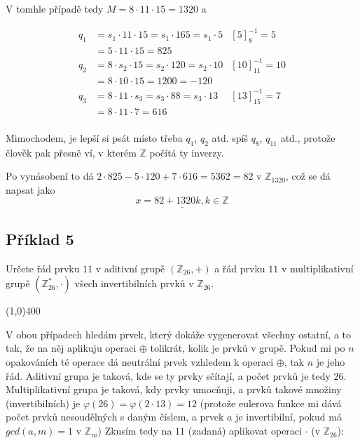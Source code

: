 \documentclass{article}
\begin{document}
V tomhle případě tedy $M = 8\cdot 11\cdot 15 = 1320$ a 

\begin{align*}
q_1 & = s_1\cdot 11 \cdot 15 = s_1 \cdot 165 = s_1 \cdot 5		& \left[ 5\right]^{-1}_8 = 5\\
		& = 5 \cdot 11 \cdot 15 = 825 & \\
q_2 & = 8 \cdot s_2 \cdot 15 = s_2 \cdot 120 = s_2 \cdot 10		& \left[ 10\right]^{-1}_{11} = 10\\
		& = 8 \cdot 10 \cdot 15 = 1200 = -120 & \\
q_3 & = 8 \cdot 11 \cdot s_3 = s_3 \cdot 88 = s_3 \cdot 13		& \left[ 13\right]^{-1}_{15} = 7 \\
		& = 8 \cdot 11 \cdot 7 = 616 & \\
\end{align*}

Mimochodem, je lepší si psát místo třeba $q_1$, $q_2$ atd. spíš $q_8$, $q_{11}$ atd., protože člověk pak přesně ví, v kterém $\mathbb{Z}$ počítá ty inverzy.

Po vynásobení to dá $2\cdot 825 - 5\cdot 120 + 7\cdot 616 = 5362 = 82$ v $\mathbb{Z}_{1320}$, což se dá napsat jako $$\underline{x = 82 + 1320k, k \in \mathbb{Z}}$$

\subsection{\label{priklad1-5}Příklad 5}
Určete řád prvku $11$ v aditivní grupě $(\mathbb{Z}_{26},+)$ a řád prvku $11$ v multiplikativní grupě $(\mathbb{Z}_{26}^{*},\cdot)$ všech invertibilních prvků v $\mathbb{Z}_{26}$.

\line(1,0){400}

V obou případech hledám prvek, který dokáže vygenerovat všechny ostatní, a to tak, že na něj aplikuju operaci $\oplus$ tolikrát, kolik je prvků v grupě. Pokud mi po $n$ opakováních té operace dá neutrální prvek vzhledem k operaci $\oplus$, tak $n$ je jeho řád. Aditivní grupa je taková, kde se ty prvky sčítají, a počet prvků je tedy $26$. Multiplikativní grupa je taková, kdy prvky umocňuji, a prvků takové množiny (invertibilních) je $\varphi(26) = \varphi(2 \cdot 13) = 12$ (protože eulerova funkce mi dává počet prvků nesoudělných s daným číslem, a prvek $a$ je invertibilní, pokud má $gcd(a, m) = 1$ v $\mathbb{Z}_m$) Zkusím tedy na $11$ (zadaná) aplikovat operaci $\cdot$ (v $\mathbb{Z}_{26}$):
\end{document}
